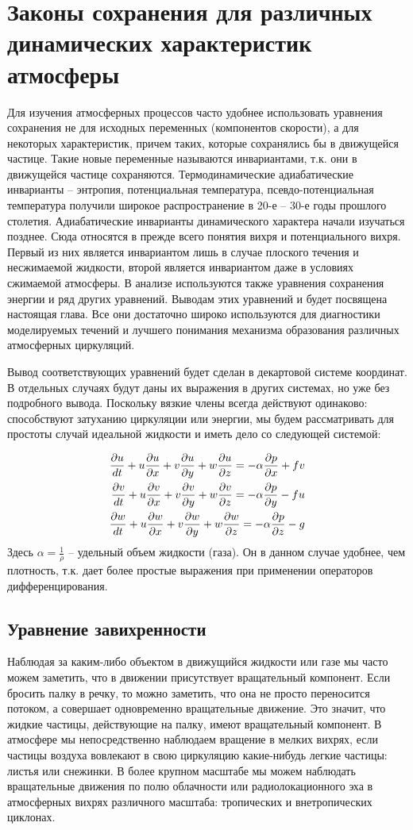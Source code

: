 \chapter{Законы сохранения для различных динамических характеристик атмосферы}
Для изучения атмосферных процессов часто удобнее использовать уравнения сохранения не для исходных переменных (компонентов скорости), а для некоторых характеристик, причем таких, которые сохранялись бы в движущейся частице. Такие новые переменные называются инвариантами, т.к. они в движущейся частице сохраняются. Термодинамические адиабатические инварианты -- энтропия, потенциальная температура, псевдо-потенциальная температура получили широкое распространение в 20-е -- 30-е годы прошлого столетия. Адиабатические инварианты динамического характера начали изучаться позднее. Сюда относятся в прежде всего понятия вихря и потенциального вихря. Первый из них является инвариантом лишь в случае плоского течения и несжимаемой жидкости, второй является инвариантом даже в условиях сжимаемой атмосферы. В анализе используются также уравнения сохранения энергии и ряд других уравнений. Выводам этих уравнений и будет посвящена настоящая глава. Все они достаточно широко используются для диагностики моделируемых течений и лучшего понимания механизма образования различных атмосферных циркуляций. 

Вывод соответствующих уравнений будет сделан в декартовой системе координат. В отдельных случаях будут даны их выражения в других системах, но уже без подробного вывода. Поскольку вязкие члены всегда действуют одинаково: способствуют затуханию циркуляции или энергии, мы будем рассматривать для простоты случай идеальной жидкости и иметь дело со следующей системой:

    \begin{align}
        \displaystyle\frac{\partial u}{dt}+ u\frac{\partial u}{\partial x}+v\frac{\partial u}{\partial y}+w\frac{\partial u}{\partial z} = -\alpha\displaystyle\frac{\partial p}{\partial x}+fv  \label{eq:ch10-DuDt} \\
        \displaystyle\frac{\partial v}{dt}+ u\frac{\partial v}{\partial x}+v\frac{\partial v}{\partial y}+w\frac{\partial v}{\partial z} = -\alpha\displaystyle\frac{\partial p}{\partial y}-fu \label{eq:ch10-DvDt}  \\
        \displaystyle\frac{\partial w}{dt}+ u\frac{\partial w}{\partial x}+v\frac{\partial w}{\partial y}+w\frac{\partial w}{\partial z} = -\alpha\displaystyle\frac{\partial p}{\partial z}-g \label{eq:ch10-DzDt}  
    \end{align}
Здесь $\alpha=\frac{1}{\rho}$ -- удельный объем жидкости (газа). Он в данном случае удобнее, чем плотность, т.к. дает более простые выражения при применении операторов дифференцирования. 

\section{{\color{done}Уравнение завихренности}} \label{ch10.1}
Наблюдая за каким-либо объектом в движущийся жидкости или газе мы часто можем заметить, что в движении присутствует вращательный компонент. Если бросить палку в речку, то можно заметить, что она не просто переносится потоком, а совершает одновременно вращательные движение. Это значит, что жидкие частицы, действующие на палку, имеют вращательный компонент. В атмосфере мы непосредственно наблюдаем вращение в мелких вихрях, если частицы воздуха вовлекают в свою циркуляцию какие-нибудь легкие частицы: листья или снежинки. В более крупном масштабе мы можем наблюдать вращательные движения по полю облачности или радиолокационного эха в атмосферных вихрях различного масштаба: тропических и внетропических циклонах. 


